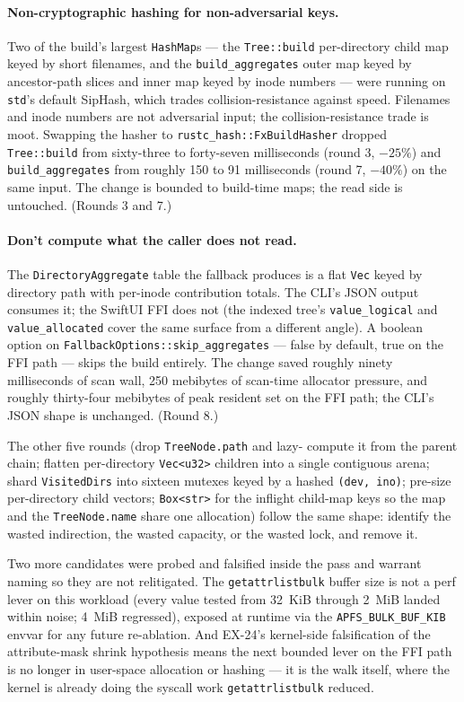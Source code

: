 \paragraph{Non-cryptographic hashing for non-adversarial keys.}
Two of the build's largest \texttt{HashMap}s --- the
\texttt{Tree::build} per-directory child map keyed by short
filenames, and the \texttt{build\_aggregates} outer map keyed by
ancestor-path slices and inner map keyed by inode numbers ---
were running on \texttt{std}'s default SipHash, which trades
collision-resistance against speed. Filenames and inode numbers
are not adversarial input; the collision-resistance trade is moot.
Swapping the hasher to \texttt{rustc\_hash::FxBuildHasher}
dropped \texttt{Tree::build} from sixty-three to forty-seven
milliseconds (round 3, $-25\%$) and \texttt{build\_aggregates}
from roughly 150 to 91 milliseconds (round 7, $-40\%$) on the
same input. The change is bounded to build-time maps; the read
side is untouched. (Rounds 3 and 7.)

\paragraph{Don't compute what the caller does not read.} The
\texttt{DirectoryAggregate} table the fallback produces is a flat
\texttt{Vec} keyed by directory path with per-inode contribution
totals. The CLI's JSON output consumes it; the SwiftUI FFI does
not (the indexed tree's \texttt{value\_logical} and
\texttt{value\_allocated} cover the same surface from a different
angle). A boolean option on
\texttt{FallbackOptions::skip\_aggregates} --- false by default,
true on the FFI path --- skips the build entirely. The change
saved roughly ninety milliseconds of scan wall, 250 mebibytes of
scan-time allocator pressure, and roughly thirty-four mebibytes
of peak resident set on the FFI path; the CLI's JSON shape is
unchanged. (Round 8.)

The other five rounds (drop \texttt{TreeNode.path} and lazy-
compute it from the parent chain; flatten per-directory
\texttt{Vec<u32>} children into a single contiguous arena; shard
\texttt{VisitedDirs} into sixteen mutexes keyed by a hashed
\texttt{(dev, ino)}; pre-size per-directory child vectors;
\texttt{Box<str>} for the inflight child-map keys so the map and
the \texttt{TreeNode.name} share one allocation) follow the same
shape: identify the wasted indirection, the wasted capacity, or
the wasted lock, and remove it.

Two more candidates were probed and falsified inside the pass and
warrant naming so they are not relitigated. The
\texttt{getattrlistbulk} buffer size is not a perf lever on this
workload (every value tested from 32~KiB through 2~MiB landed
within noise; 4~MiB regressed), exposed at runtime via the
\texttt{APFS\_BULK\_BUF\_KIB} envvar for any future re-ablation.
And EX-24's kernel-side falsification of the attribute-mask
shrink hypothesis means the next bounded lever on the FFI path is
no longer in user-space allocation or hashing --- it is the walk
itself, where the kernel is already doing the syscall work
\texttt{getattrlistbulk} reduced.

